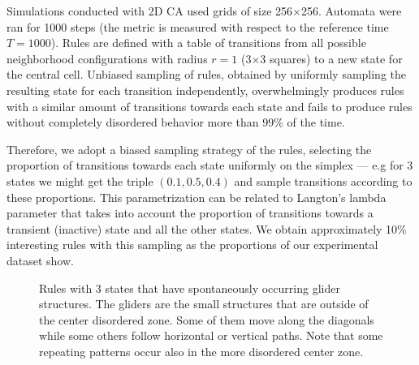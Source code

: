 Simulations conducted with 2D CA used grids of size 256$\times$256. Automata
were ran for 1000 steps (the metric is measured with respect to the reference
time $T = 1000$). Rules are defined with a table of transitions from all
possible neighborhood configurations with radius $r=1$ (3$\times$3 squares) to a
new state for the central cell. Unbiased sampling of rules, obtained by
uniformly sampling the resulting state for each transition independently,
overwhelmingly produces rules with a similar amount of transitions towards each
state and fails to produce rules without completely disordered behavior more
than 99\% of the time.

Therefore, we adopt a biased sampling strategy of the rules, selecting the
proportion of transitions towards each state uniformly on the simplex --- e.g
for 3 states we might get the triple $(0.1, 0.5, 0.4)$ and sample transitions
according to these proportions. This parametrization can be related to Langton's
lambda parameter \parencite{langton_computation_1990} that takes into account the
proportion of transitions towards a transient (inactive) state and all the other
states. We obtain approximately 10\% interesting rules with this sampling as the
proportions of our experimental dataset show.

\begin{figure}[t]
  \centering
  \hfil
  \caption{Rules with 3 states that have spontaneously occurring glider
    structures. The gliders are the small structures that are outside of the
    center disordered zone. Some of them move along the diagonals while some
    others follow horizontal or vertical paths. Note that some repeating
    patterns occur also in the more disordered center zone.}
  \label{fig:gliders}
\end{figure}

